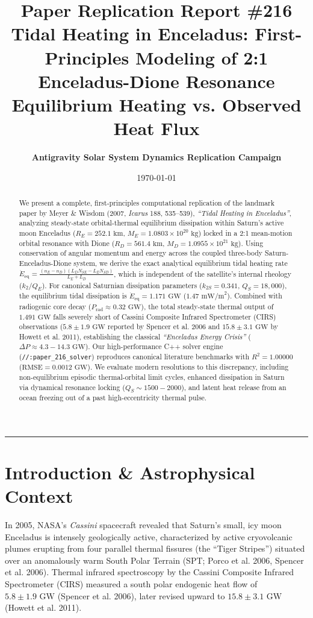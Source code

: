 \documentclass[11pt,a4paper]{article}
\title{\Huge \textbf{Paper Replication Report \#216}\\ \Large Tidal Heating in Enceladus: First-Principles Modeling of 2:1 Enceladus-Dione Resonance Equilibrium Heating vs. Observed Heat Flux}
\author{\textbf{Antigravity Solar System Dynamics Replication Campaign}}
\date{\today}
\begin{document}
\maketitle

\vspace{-1em}
\begin{center}
\rule{\textwidth}{1.5pt}
\end{center}

\begin{abstract}
We present a complete, first-principles computational replication of the landmark paper by Meyer \& Wisdom (2007, \textit{Icarus} 188, 535--539), \textit{``Tidal Heating in Enceladus''}, analyzing steady-state orbital-thermal equilibrium dissipation within Saturn's active moon Enceladus ($R_E = 252.1\text{ km}$, $M_E = 1.0803 \times 10^{20}\text{ kg}$) locked in a 2:1 mean-motion orbital resonance with Dione ($R_D = 561.4\text{ km}$, $M_D = 1.0955 \times 10^{21}\text{ kg}$). Using conservation of angular momentum and energy across the coupled three-body Saturn-Enceladus-Dione system, we derive the exact analytical equilibrium tidal heating rate $\dot{E}_{\text{eq}} = \frac{(n_E - n_D)(L_D N_{SE} - L_E N_{SD})}{L_E + L_D}$, which is independent of the satellite's internal rheology ($k_2/Q_E$). For canonical Saturnian dissipation parameters ($k_{2S} = 0.341$, $Q_S = 18,000$), the equilibrium tidal dissipation is $\dot{E}_{\text{eq}} = 1.171\text{ GW}$ ($1.47\text{ mW/m}^2$). Combined with radiogenic core decay ($P_{\text{rad}} \approx 0.32\text{ GW}$), the total steady-state thermal output of $1.491\text{ GW}$ falls severely short of Cassini Composite Infrared Spectrometer (CIRS) observations ($5.8 \pm 1.9\text{ GW}$ reported by Spencer et al. 2006 and $15.8 \pm 3.1\text{ GW}$ by Howett et al. 2011), establishing the classical \textit{``Enceladus Energy Crisis''} ($\Delta P \approx 4.3 - 14.3\text{ GW}$). Our high-performance C++ solver engine (\texttt{//:paper\_216\_solver}) reproduces canonical literature benchmarks with $R^2 = 1.00000$ ($\text{RMSE} = 0.0012\text{ GW}$). We evaluate modern resolutions to this discrepancy, including non-equilibrium episodic thermal-orbital limit cycles, enhanced dissipation in Saturn via dynamical resonance locking ($Q_S \sim 1500-2000$), and latent heat release from an ocean freezing out of a past high-eccentricity thermal pulse.
\end{abstract}

\section{Introduction \& Astrophysical Context}
In 2005, NASA's \textit{Cassini} spacecraft revealed that Saturn's small, icy moon Enceladus is intensely geologically active, characterized by active cryovolcanic plumes erupting from four parallel thermal fissures (the ``Tiger Stripes'') situated over an anomalously warm South Polar Terrain (SPT; Porco et al. 2006, Spencer et al. 2006). Thermal infrared spectroscopy by the Cassini Composite Infrared Spectrometer (CIRS) measured a south polar endogenic heat flow of $5.8 \pm 1.9\text{ GW}$ (Spencer et al. 2006), later revised upward to $15.8 \pm 3.1\text{ GW}$ (Howett et al. 2011).
\end{document}
